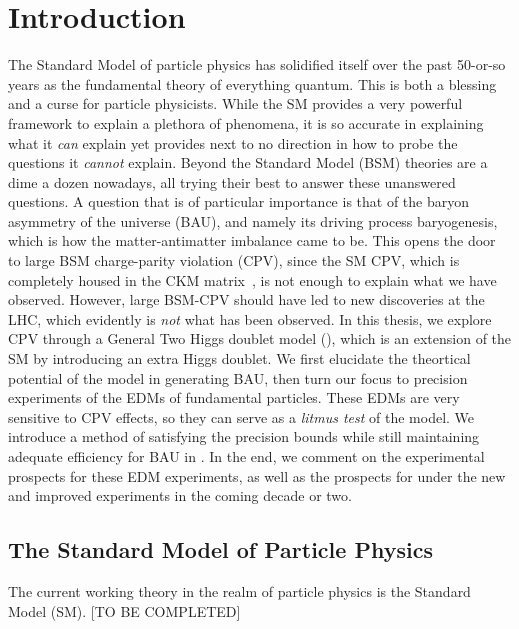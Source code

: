 \chapter{Introduction}
\label{ch:intro}

The Standard Model of particle physics has solidified itself over the past 50-or-so years as the fundamental theory of everything quantum.
This is both a blessing and a curse for particle physicists. 
While the SM provides a very powerful framework to explain a plethora of phenomena, 
it is so accurate in explaining what it \emph{can} explain 
yet provides next to no direction in how to probe the questions it \emph{cannot} explain.
Beyond the Standard Model (BSM) theories are a dime a dozen nowadays, 
all trying their best to answer these unanswered questions.
A question that is of particular importance is that of the baryon asymmetry of the universe (BAU),
and namely its driving process baryogenesis,
which is how the matter-antimatter imbalance came to be.
This opens the door to large BSM charge-parity violation (CPV),
since the SM CPV, which is completely housed in the CKM matrix~\cite{PDG2022},
is not enough to explain what we have observed.
However, large BSM-CPV should have led to new discoveries at the LHC, which evidently is \textit{not} what has been observed.
In this thesis, we explore CPV through a General Two Higgs doublet model ({\gthdm}), 
which is an extension of the SM by introducing an extra Higgs doublet.
We first elucidate the theortical potential of the model in generating BAU,
then turn our focus to precision experiments of the EDMs of fundamental particles.
These EDMs are very sensitive to CPV effects, so they can serve as a \emph{litmus test} of the model.
We introduce a method of satisfying the precision bounds while still maintaining adequate efficiency for BAU in {\gthdm}.
In the end, we comment on the experimental prospects for these EDM experiments,
as well as the prospects for {\gthdm} under the new and improved experiments in the coming decade or two.

\section{The Standard Model of Particle Physics}
The current working theory in the realm of particle physics is the Standard Model (SM). 
[TO BE COMPLETED]

